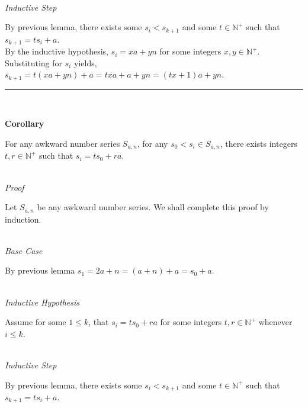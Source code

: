 \documentclass[a4paper,12pt]{article}
\begin{document}
\noindent \\
\textit{Inductive Step}

\noindent By previous lemma, there exists some $s_i < s_{k+1}$ and some $t \in \mathbb{N}^+$ such that $s_{k+1} = ts_i + a$.\\

\noindent By the inductive hypothesis, $s_i = xa + yn$ for some integers $x, y \in \mathbb{N}^+$.\\

\noindent Substituting for $s_i$ yields, $s_{k+1} = t(xa + yn) + a = txa + a + yn = (tx + 1)a + yn$.\\



\begin{center}
\noindent\rule{8cm}{0.4pt}
\end{center}
\noindent \\







\label{corollary:relation_to_initial}
\hypertarget{corollary:relation_to_initial}{}
\begin{tcolorbox}
\textbf{Corollary}

For any awkward number series $S_{a,n}$, for any $s_0 < s_i \in S_{a,n}$, there exists integers $t, r \in \mathbb{N}^+$ such that $s_i = ts_0 + ra$.

\end{tcolorbox}


\noindent \\
\textit{Proof}

\noindent Let $S_{a, n}$ be any awkward number series. We shall complete this proof by induction.


\noindent \\
\textit{Base Case}

\noindent By previous lemma $s_1 = 2a + n = (a + n) + a = s_0 + a$.


\noindent \\
\textit{Inductive Hypothesis}

\noindent Assume for some $1 \leq k$, that $s_i = ts_0 + ra$ for some integers $t, r \in \mathbb{N}^+$ whenever $i \leq k$.


\noindent  \\
\textit{Inductive Step}

\noindent By previous lemma, there exists some $s_i < s_{k+1}$ and some $t \in \mathbb{N}^+$ such that $s_{k+1} = ts_i + a$.\\
\end{document}
